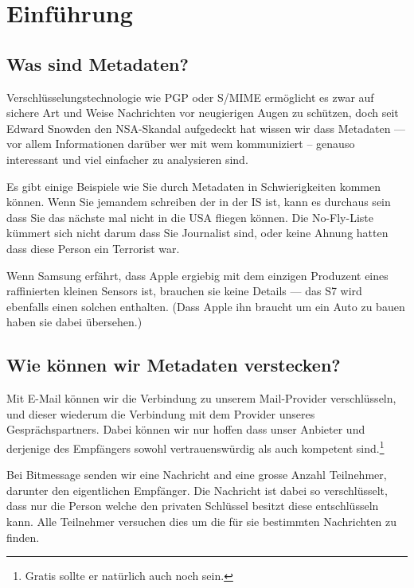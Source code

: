   \section{Einführung}

  \subsection{Was sind Metadaten?}

  Verschlüsselungstechnologie wie PGP oder S/MIME ermöglicht es zwar auf sichere Art und Weise Nachrichten vor neugierigen Augen zu schützen, doch seit Edward Snowden den NSA-Skandal aufgedeckt hat wissen wir dass Metadaten --- vor allem Informationen darüber wer mit wem kommuniziert -- genauso interessant und viel einfacher zu analysieren sind.

  Es gibt einige Beispiele wie Sie durch Metadaten in Schwierigkeiten kommen können. Wenn Sie jemandem schreiben der in der IS ist, kann es durchaus sein dass Sie das nächste mal nicht in die USA fliegen können. Die No-Fly-Liste kümmert sich nicht darum dass Sie Journalist sind, oder keine Ahnung hatten dass diese Person ein Terrorist war.

  Wenn Samsung erfährt, dass Apple ergiebig mit dem einzigen Produzent eines raffinierten kleinen Sensors ist, brauchen sie keine Details --- das S7 wird ebenfalls einen solchen enthalten. (Dass Apple ihn braucht um ein Auto zu bauen haben sie dabei übersehen.)

  \subsection{Wie können wir Metadaten verstecken?}

  Mit E-Mail können wir die Verbindung zu unserem Mail-Provider verschlüsseln, und dieser wiederum die Verbindung mit dem Provider unseres Gesprächspartners. Dabei können wir nur hoffen dass unser Anbieter und derjenige des Empfängers sowohl vertrauenswürdig als auch kompetent sind.\footnote{Gratis sollte er natürlich auch noch sein.}

  Bei Bitmessage senden wir eine Nachricht and eine grosse Anzahl Teilnehmer, darunter den eigentlichen Empfänger. Die Nachricht ist dabei so verschlüsselt, dass nur die Person welche den privaten Schlüssel besitzt diese entschlüsseln kann. Alle Teilnehmer versuchen dies um die für sie bestimmten Nachrichten zu finden.